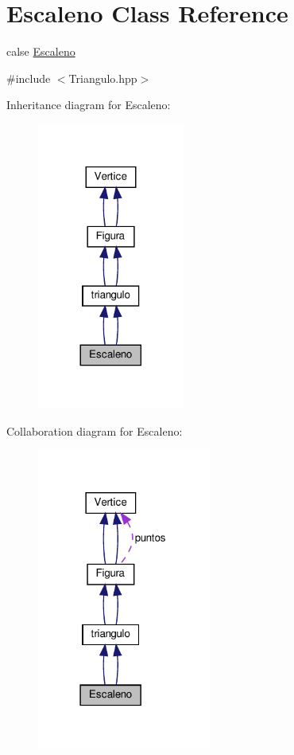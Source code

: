 \hypertarget{class_escaleno}{}\section{Escaleno Class Reference}
\label{class_escaleno}


calse \hyperlink{class_escaleno}{Escaleno}  




{\ttfamily \#include $<$Triangulo.\+hpp$>$}



Inheritance diagram for Escaleno\+:
\nopagebreak
\begin{figure}[H]
\begin{center}
\leavevmode
\includegraphics[width=137pt]{class_escaleno__inherit__graph}
\end{center}
\end{figure}


Collaboration diagram for Escaleno\+:
\nopagebreak
\begin{figure}[H]
\begin{center}
\leavevmode
\includegraphics[width=162pt]{class_escaleno__coll__graph}
\end{center}
\end{figure}
